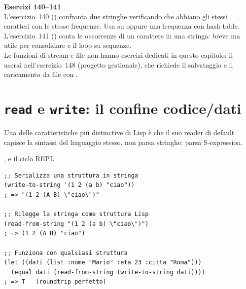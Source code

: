 \begin{workbook}
\textbf{Esercizi 140--141}\\[4pt]
L'esercizio~140 () confronta due stringhe
verificando che abbiano gli stessi caratteri con le stesse frequenze.
Usa  su  oppure una frequenza con hash table.
L'esercizio~141 () conta le occorrenze di un carattere
in una stringa: breve ma utile per consolidare 
e il loop su sequenze.\\[4pt]
Le funzioni di stream e file non hanno esercizi dedicati
in questo capitolo: li userai nell'esercizio~148 (progetto
gestionale), che richiede il salvataggio e il caricamento
da file con .
\end{workbook}

\section{\texttt{read} e \texttt{write}: il confine codice/dati}

Una delle caratteristiche più distinctive di Lisp
è che il suo reader di default capisce la sintassi
del linguaggio stesso.
 non parsa stringhe: parsa S-expression.

\begin{concetto}{,  e il ciclo REPL}

\boxsep
{}
\end{concetto}

\begin{esempio}
\begin{lstlisting}
;; Serializza una struttura in stringa
(write-to-string '(1 2 (a b) "ciao"))
; => "(1 2 (A B) \"ciao\")"

;; Rilegge la stringa come struttura Lisp
(read-from-string "(1 2 (a b) \"ciao\")")
; => (1 2 (A B) "ciao")

;; Funziona con qualsiasi struttura
(let ((dati (list :nome "Mario" :eta 23 :citta "Roma")))
  (equal dati (read-from-string (write-to-string dati))))
; => T   (roundtrip perfetto)
\end{lstlisting}
\end{esempio}

